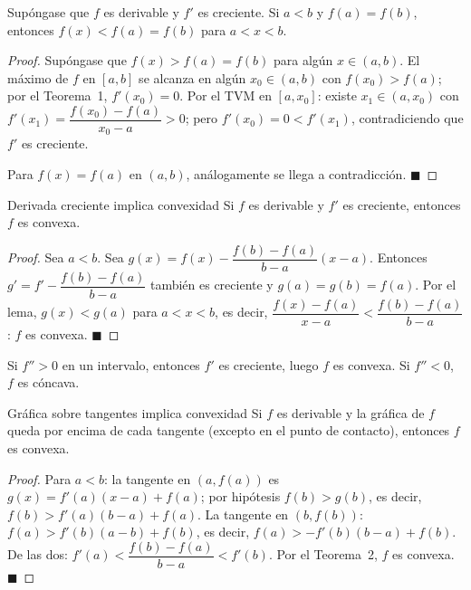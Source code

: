 \documentclass[12pt]{article}
\begin{document}
\begin{lema}[]{}
Supóngase que $f$ es derivable y $f'$ es creciente. Si $a < b$ y $f(a) = f(b)$, entonces $f(x) < f(a) = f(b)$ para $a < x < b$.
\end{lema}

\begin{proof}
Supóngase que $f(x) > f(a) = f(b)$ para algún $x \in (a,b)$. El máximo de $f$ en $[a,b]$ se alcanza en algún $x_0 \in (a,b)$ con $f(x_0) > f(a)$; por el Teorema~1, $f'(x_0) = 0$. Por el TVM en $[a, x_0]$: existe $x_1 \in (a, x_0)$ con $f'(x_1) = \dfrac{f(x_0)-f(a)}{x_0-a} > 0$; pero $f'(x_0) = 0 < f'(x_1)$, contradiciendo que $f'$ es creciente.

Para $f(x) = f(a)$ en $(a,b)$, análogamente se llega a contradicción.
$\blacksquare$
\end{proof}

\begin{teorema}[2]{Derivada creciente implica convexidad}
Si $f$ es derivable y $f'$ es creciente, entonces $f$ es convexa.
\end{teorema}

\begin{proof}
Sea $a < b$. Sea $g(x) = f(x) - \dfrac{f(b)-f(a)}{b-a}(x-a)$. Entonces $g' = f' - \dfrac{f(b)-f(a)}{b-a}$ también es creciente y $g(a) = g(b) = f(a)$. Por el lema, $g(x) < g(a)$ para $a < x < b$, es decir, $\dfrac{f(x)-f(a)}{x-a} < \dfrac{f(b)-f(a)}{b-a}$: $f$ es convexa.
$\blacksquare$
\end{proof}

\begin{corolario}[]{}
Si $f'' > 0$ en un intervalo, entonces $f' $ es creciente, luego $f$ es convexa. Si $f'' < 0$, $f$ es cóncava.
\end{corolario}

\begin{teorema}[3]{Gráfica sobre tangentes implica convexidad}
Si $f$ es derivable y la gráfica de $f$ queda por encima de cada tangente (excepto en el punto de contacto), entonces $f$ es convexa.
\end{teorema}

\begin{proof}
Para $a < b$: la tangente en $(a,f(a))$ es $g(x)=f'(a)(x-a)+f(a)$; por hipótesis $f(b) > g(b)$, es decir, $f(b) > f'(a)(b-a)+f(a)$. La tangente en $(b,f(b))$: $f(a) > f'(b)(a-b)+f(b)$, es decir, $f(a) > -f'(b)(b-a)+f(b)$. De las dos: $f'(a) < \dfrac{f(b)-f(a)}{b-a} < f'(b)$. Por el Teorema~2, $f$ es convexa.
$\blacksquare$
\end{proof}
\end{document}
